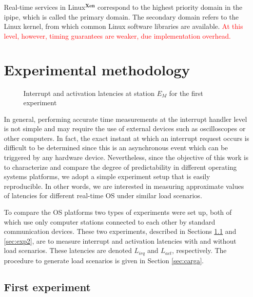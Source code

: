 \documentclass{acm_proc_article-sp}
\newcommand{\col}[1]{\textcolor{red}{#1}}
\begin{document}
Real-time services in Linux$^{\mathbf{Xen}}$ correspond to the highest priority
domain in the ipipe, which is called the primary domain. The secondary domain refers
to the Linux kernel, from which common Linux software libraries are available. \col{At
this level, however, timing guarantees are weaker, due implementation overhead.}


\section{Experimental methodology}
\label{sec:metod}

\begin{figure*}[t]
  \centering {\scalebox{1}{}}
  \caption{Interrupt and activation latencies at station $E_M$ for the
    first experiment}
  \label{fig:dispExp}
\end{figure*}

In general, performing accurate time measurements at the interrupt handler level is
not simple and may require the use of external devices such as oscilloscopes or
other computers. In fact, the exact instant at which an interrupt request occurs is
difficult to be determined since this is an asynchronous event which can be
triggered by any hardware device. Nevertheless, since the objective of this work is
to characterize and compare the degree of predictability in different operating
systems platforms, we adopt a simple experiment setup that is easily reproducible.
In other words, we are interested in measuring approximate values of latencies for
different real-time OS under similar load scenarios.
 
To compare the OS platforms two types of experiments were set up, both of which use
only computer stations connected to each other by standard communication
devices. These two experiments, described in Sections \ref{sec:exp1} and
\ref{sec:exp2}, are to measure interrupt and activation latencies with and without
load scenarios.  These latencies are denoted $L_{irq}$ and $L_{act}$,
respectively. The procedure to generate load scenarios is given in Section
\ref{sec:carga}.  \newline

\subsection{First experiment}
\label{sec:exp1}
\end{document}
